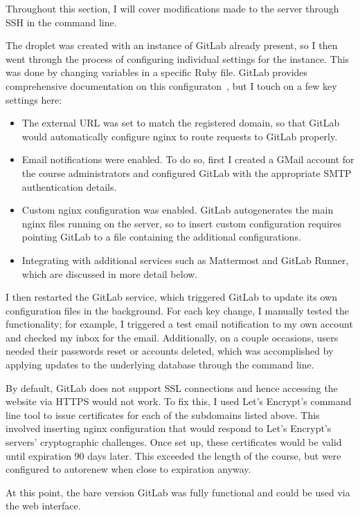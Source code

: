 \documentclass[12pt,twoside]{mitthesis}
\newcommand{\draft}[1]{{#1}}
\begin{document}
\draft{Throughout this section, I will cover modifications made to the server through SSH in the command line.

The droplet was created with an instance of GitLab already present, so I then went through the process of configuring individual settings for the instance. This was done by changing variables in a specific Ruby file. GitLab provides comprehensive documentation on this configuraton~\cite{gitlabdocs}, but I touch on a few key settings here:
\begin{itemize}
\item The external URL was set to match the registered domain, so that GitLab would automatically configure nginx to route requests to GitLab properly.
\item Email notifications were enabled. To do so, first I created a GMail account for the course administrators and configured GitLab with the appropriate SMTP authentication details. 
\item Custom nginx configuration was enabled. GitLab autogenerates the main nginx files running on the server, so to insert custom configuration requires pointing GitLab to a file containing the additional configurations.
\item Integrating with additional services such as Mattermost and GitLab Runner, which are discussed in more detail below.
\end{itemize}
I then restarted the GitLab service, which triggered GitLab to update its own configuration files in the background. For each key change, I manually tested the functionality; for example, I triggered a test email notification to my own account and checked my inbox for the email. Additionally, on a couple occasions, users needed their passwords reset or accounts deleted, which was accomplished by applying updates to the underlying database through the command line.

By default, GitLab does not support SSL connections and hence accessing the website via HTTPS would not work. To fix this, I used Let's Encrypt's command line tool to issue certificates for each of the subdomains listed above. This involved inserting nginx configuration that would respond to Let's Encrypt's servers' cryptographic challenges. Once set up, these certificates would be valid until expiration 90 days later. This exceeded the length of the course, but were configured to autorenew when close to expiration anyway. 

At this point, the bare version GitLab was fully functional and could be used via the web interface.

}
\end{document}
